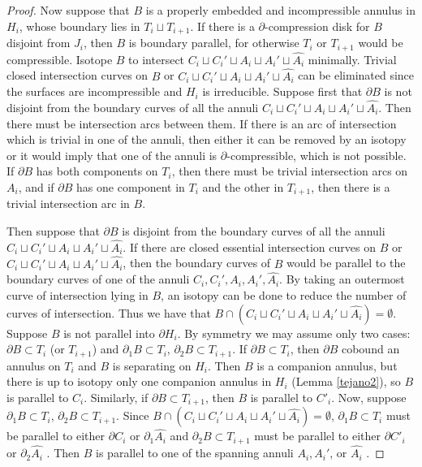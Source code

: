 \documentclass[12pt]{amsart}
\begin{document}
\begin{proof}
Now suppose that $B$ is a properly embedded and incompressible annulus in $H_i$, whose boundary lies in $T_i\sqcup T_{i+1}$. If there is a $\partial$-compression disk for $B$ disjoint from $J_i$, then $B$ is boundary parallel, for otherwise $T_i$ or $T_{i+1}$ would be compressible. Isotope $B$ to intersect $C_i\sqcup C_i'\sqcup A_i\sqcup A_i'\sqcup  \widehat{A_i}$ minimally. Trivial closed intersection curves on $B$ or $C_i\sqcup C_i'\sqcup A_i\sqcup A_i'\sqcup \widehat{A_i}$ can be eliminated since the surfaces are incompressible and $H_i$ is irreducible. Suppose first that $\partial B$ is not disjoint from the boundary curves of all the annuli $C_i\sqcup C_i'\sqcup A_i\sqcup A_i'\sqcup \widehat{A_i}$. Then there must be intersection arcs between them. If there is an arc of intersection which is trivial in one of the annuli, then either it can be removed by an isotopy or it would imply that one of the annuli is $\partial$-compressible, which is not possible. If $\partial B$ has both components on $T_i$, then there must be trivial intersection arcs on $A_i$, and if $\partial B$ has one component in $T_i$ and the other in $T_{i+1}$, then there is a trivial intersection arc in $B$. 

Then suppose that $\partial B$ is disjoint from the boundary curves of all the annuli $C_i\sqcup C_i'\sqcup A_i\sqcup A_i'\sqcup \widehat{A_i}$. If there are closed essential intersection curves on $B$ or $C_i\sqcup C_i'\sqcup A_i\sqcup A_i'\sqcup \widehat{A_i}$, then the boundary curves of $B$ would be parallel to the boundary curves of one of the annuli $C_i, C_i', A_i, A_i', \widehat{A_i}$. By taking an outermost curve of intersection lying in $B$, an isotopy can be done to reduce the number of curves of intersection. Thus we have that $B\cap(C_i\sqcup C_i'\sqcup A_i\sqcup A_i'\sqcup \widehat{A_i})=\emptyset$. Suppose $B$ is not parallel into $\partial H_i$. By symmetry we may assume only two cases: $\partial B\subset T_i$ (or $T_{i+1}$) and $\partial_1 B\subset T_i$, $\partial_2 B\subset T_{i+1}$.
If $\partial B\subset T_i$, then $\partial B$ cobound an annulus on $T_i$ and $B$ is separating on $H_i$. Then $B$ is a companion annulus, but there is up to isotopy only one companion annulus in $H_i$ (Lemma \ref{tejano2}), so $B$ is parallel to $C_i$. Similarly, if $\partial B\subset T_{i+1}$, then $B$ is parallel to $C'_i$.
Now, suppose $\partial_1 B\subset T_i$, $\partial_2 B\subset T_{i+1}$. Since $B\cap(C_i\sqcup C_i'\sqcup A_i\sqcup A_i'\sqcup \widehat{A_i})=\emptyset$, $\partial_1 B\subset T_i$ must be parallel to either $\partial C_i$ or $\partial_1\widehat{A_i}$ and $\partial_2 B\subset T_{i+1}$ must be parallel to either $\partial C'_i$ or $\partial_2\widehat{A_i}$ . Then $B$ is parallel to one of the spanning annuli $A_i, A_i'$, or $\widehat{A_i}$ .

\end{proof}
\end{document}

